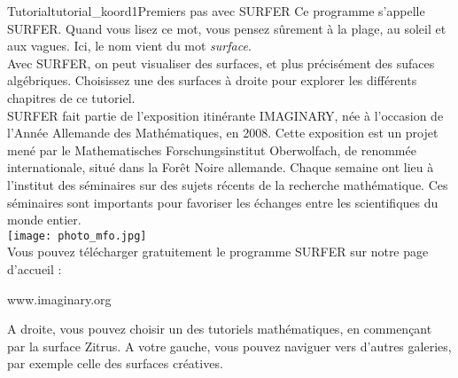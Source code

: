 \begin{surferIntroPage}{Tutorial}{tutorial_koord1}{Premiers pas avec SURFER}
Ce programme s'appelle SURFER. Quand vous lisez ce mot, vous pensez sûrement à la plage, au soleil et aux vagues. Ici, le nom vient du mot {\it surface}.
\\
Avec SURFER, on peut visualiser des surfaces, et plus précisément des sufaces algébriques. Choisissez une des surfaces à droite pour explorer les différents chapitres de ce tutoriel.\\
SURFER fait partie de l'exposition itinérante IMAGINARY, née à l'occasion de l'Année Allemande des Mathématiques, en 2008. Cette exposition est un projet mené par le Mathematisches Forschungsinstitut Oberwolfach, de renommée internationale, situé dans la Forêt Noire allemande. Chaque semaine ont lieu à l'institut des séminaires sur des sujets récents de la recherche mathématique. Ces séminaires sont importants pour favoriser les échanges entre les scientifiques du monde entier. \\
\vspace{0.2cm} \hspace{3.5cm}\texttt{[image: photo\_mfo.jpg]}\\
Vous pouvez télécharger gratuitement le programme SURFER sur notre page d'accueil :\\
\begin{centering}
www.imaginary.org\\
\end{centering}
 \vspace{0.2cm}
A droite, vous pouvez choisir un des tutoriels mathématiques, en commençant par la surface Zitrus. A votre gauche, vous pouvez naviguer vers d'autres galeries, par exemple celle des surfaces créatives.
\end{surferIntroPage}
